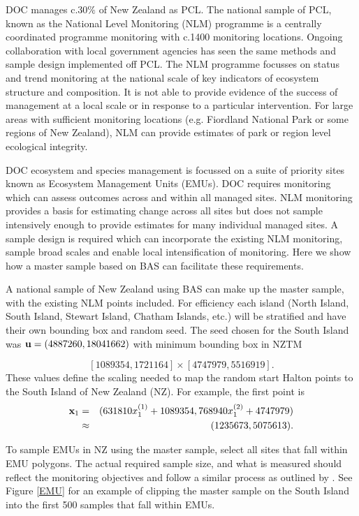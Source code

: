 \documentclass[titlepage]{article}
\begin{document}
DOC manages c.30$\%$ of New Zealand as PCL. The national sample of PCL, known as the National Level Monitoring (NLM) programme is a centrally coordinated programme monitoring with c.1400 monitoring locations. Ongoing collaboration with local government agencies has seen the same methods and sample design implemented off PCL. The NLM programme focusses on status and trend monitoring at the national scale of key indicators of ecosystem structure and composition. It is not able to provide evidence of the success of management at a local scale or in response to a particular intervention. For large areas with sufficient monitoring locations (e.g. Fiordland National Park or some regions of New Zealand), NLM can provide estimates of park or region level ecological integrity. 

DOC ecosystem and species management is focussed on a suite of priority sites known as Ecosystem Management Units (EMUs). DOC requires monitoring which can assess outcomes across and within all managed sites. NLM monitoring provides a basis for estimating change across all sites but does not sample intensively enough to provide estimates for many individual managed sites. A sample design is required which can incorporate the existing NLM monitoring, sample broad scales and enable local intensification of monitoring. Here we show how a master sample based on BAS can facilitate these requirements.    

A national sample of New Zealand using BAS can make up the master sample, with the existing NLM points included. For efficiency each island (North Island, South Island, Stewart Island, Chatham Islands, etc.) will be stratified and have their own bounding box and random seed. The seed chosen for the South Island was ${\bf u} = (4887260, 18041662)$ with minimum bounding box in NZTM

$$
[1089354, 1721164] \times [4747979, 5516919].
$$
These values define the scaling needed to map the random start Halton points to the South Island of New Zealand (NZ). For example, the first point is
\begin{eqnarray*}
	{\bf x}_1 & = & (631810 x_1^{(1)} + 1089354, 768940 x_1^{(2)} + 4747979)\\
	& \approx & (1235673, 5075613).
\end{eqnarray*}

To sample EMUs in NZ using the master sample, select all sites that fall within EMU polygons. The actual required sample size, and what is measured should reflect the monitoring objectives and follow a similar process as outlined by \citep{Reynolds2016}. See Figure \ref{EMU} for an example of clipping the master sample on the South Island into the first 500 samples that fall within EMUs.
 
\end{document}
